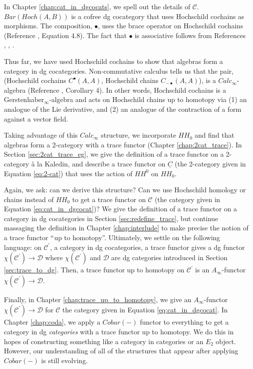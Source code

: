 In Chapter \ref{chap:cat_in_dgcocats}, we spell out the details of $\mathcal{C}$. $Bar(Hoch(A,B))$ is a cofree dg cocategory that uses Hochschild cochains as morphisms. The composition, $\bullet$, uses the brace operator on Hochschild cochains (Reference \cite{T}, Equation 4.8). The fact that $\bullet$ is associative follows from References \cite{GJ}, \cite{GV}, \cite{Ka}. 

Thus far, we have used Hochschild cochains to show that algebras form a category in dg cocategories. Non-commutative calculus tells us that the pair, (Hochschild cochains $C^\bullet(A,A)$, Hochschild chains $C_{-\bullet}(A,A)$), is a $Calc_\infty$-algebra (Reference \cite{DTT}, Corollary 4). In other words, Hochschild cochains is a Gerstenhaber$_\infty$-algebra and acts on Hochschild chains up to homotopy via (1) an analogue of the Lie derivative, and (2) an analogue of the contraction of a form against a vector field.

Taking advantage of this $Calc_\infty$ structure, we incorporate $HH_0$ and find that algebras form a 2-category with a trace functor (Chapter \ref{chap:2cat_trace}). In Section \ref{sec:2cat_trace_eg}, we give the definition of a trace functor on a 2-category \`{a} la Kaledin, and describe a trace functor on $\underline{C}$ (the 2-category given in Equation \ref{eq:2-cat}) that uses the action of $HH^0$ on $HH_0$.

Again, we ask: can we derive this structure? Can we use Hochschild homology or chains instead of $HH_0$ to get a trace functor on $\mathcal{C}$ (the category given in Equation \ref{eq:cat_in_dgcocat})? We give the definition of a trace functor on a category in dg cocategories in Section \ref{sec:redefine_trace}, but continue massaging the definition in Chapter \ref{chap:interlude} to make precise the notion of a trace functor $``$up to homotopy''. Ultimately, we settle on the following language: on $\mathcal{C}^\prime$, a category in dg cocategories, a trace functor gives a dg functor $\chi(\mathcal{C}^\prime) \to \mathcal{D}$ where $\chi(\mathcal{C}^\prime)$ and $\mathcal{D}$ are dg categories introduced in Section \ref{sec:trace_to_dg}. Then, a trace functor up to homotopy on $\mathcal{C}^\prime$ is an $A_\infty$-functor $\chi(\mathcal{C}^\prime) \to \mathcal{D}$.

Finally, in Chapter \ref{chap:trace_up_to_homotopy}, we give an $A_\infty$-functor $\chi(\mathcal{C}^\prime) \to \mathcal{D}$ for $\mathcal{C}$ the category given in Equation \ref{eq:cat_in_dgcocat}. In Chapter \ref{chap:coda}, we apply a $Cobar(-)$ functor to everything to get a category in dg \textit{categories} with a trace functor up to homotopy. We do this in hopes of constructing something like a category in categories or an $E_2$ object. However, our understanding of all of the structures that appear after applying $Cobar(-)$ is still evolving.

